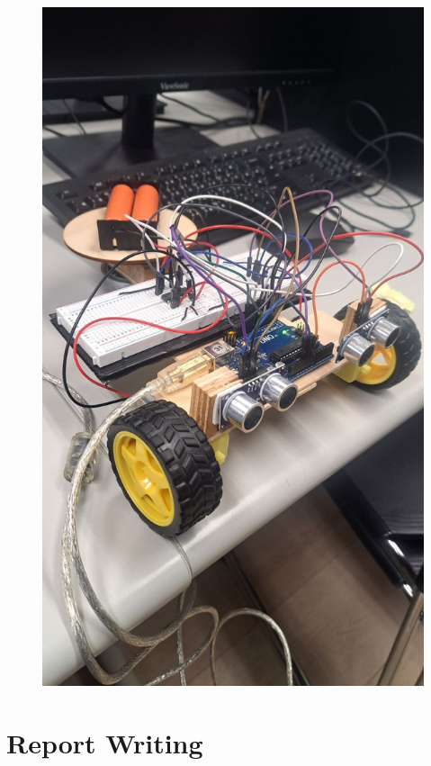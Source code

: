 \documentclass[a4paper,12pt]{article}
\begin{document}
\begin{center}
\begin{figure}[H]
\begin{minipage}[t]{0.45\textwidth}
\includegraphics[width=\textwidth]{./photos/h.jpg}
\end{minipage}
\hfill
\end{figure}\FloatBarrier\end{center}

\section{Report Writing}
\end{document}
